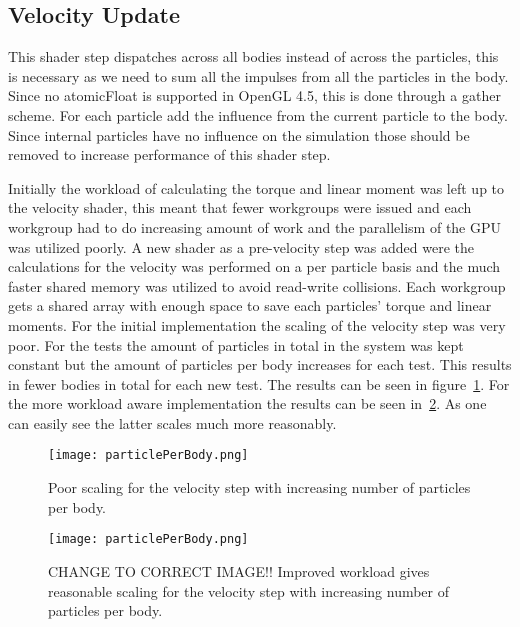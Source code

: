 \subsection{Velocity Update}
This shader step dispatches across all bodies instead of across the particles, this
is necessary as we need to sum all the impulses from all the particles in the body.
Since no atomicFloat is supported in OpenGL 4.5, this is done through a gather scheme.
For each particle add the influence from the current particle to the body.
Since internal particles have no influence on the simulation
those should be removed to increase performance of this shader step.

Initially the workload of calculating the torque and linear moment was left up to the velocity shader,
this meant that fewer workgroups were issued and each workgroup had to do increasing
amount of work and the parallelism of the GPU was utilized poorly. A new shader as
a pre-velocity step was added were the calculations for the velocity was performed
on a per particle basis and the much faster shared memory was utilized to avoid
read-write collisions. Each workgroup gets a shared array with enough space to save
each particles' torque and linear moments. For the initial implementation the scaling of
the velocity step was very poor. For the tests the amount of particles in total in the
system was kept constant but the amount of particles per body increases for each test.
This results in fewer bodies in total for each new test. The results can be seen in figure~\ref{fig:velScale1}.
For the more workload aware implementation the results can be seen in~\ref{fig:velScale2}.
As one can easily see the latter scales much more reasonably.

\begin{figure}[H]
  \centering
  \texttt{[image: particlePerBody.png]}
  \caption{Poor scaling for the velocity step with increasing number of particles per body.}
  \label{fig:velScale1}
\end{figure}

\begin{figure}[H]
  \centering
  \texttt{[image: particlePerBody.png]} %
  \caption{CHANGE TO CORRECT IMAGE!! Improved workload gives reasonable scaling for the velocity step with increasing number of particles per body.}
  \label{fig:velScale2}
\end{figure}

